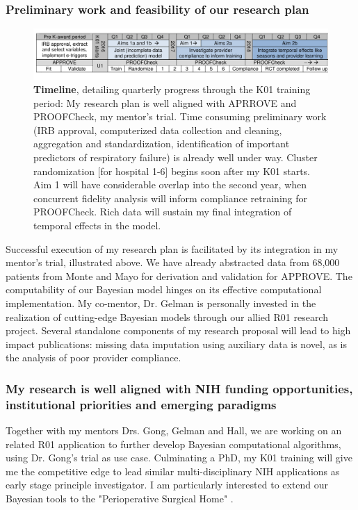 \documentclass[11pt,notitlepage]{article}
\begin{document}
\subsubsection*{Preliminary work and feasibility of our research plan }

\begin{figure}[h]
 \vspace{-20pt}
 \centering
   \includegraphics[scale=1]{Figures/Timeline.pdf}  
 \vspace{-30pt}
 \caption*{\footnotesize \textbf{Timeline}, detailing quarterly progress through the K01 training period: My research plan is well aligned with APRROVE and PROOFCheck, my mentor's trial. Time consuming preliminary work (IRB approval, computerized data collection and cleaning, aggregation and standardization, identification of important predictors of respiratory failure) is already well under way. Cluster randomization [for hospital 1-6] begins soon after my K01 starts. Aim 1 will have considerable overlap into the second year, when concurrent fidelity analysis will inform compliance retraining for PROOFCheck. Rich data will sustain my final integration of temporal effects in the model.}
  \vspace{-10pt}
  \label{fig:Timeline}
 \end{figure}
 
Successful execution of my research plan is facilitated by its integration in my mentor's trial, illustrated above. We have already abstracted data from 68,000 patients from Monte and Mayo for derivation and validation for APPROVE. The computability of our Bayesian model hinges on its effective computational implementation. My co-mentor, Dr. Gelman is personally invested in the realization of cutting-edge Bayesian models through our allied R01 research project. Several standalone components of my research proposal will lead to high impact publications: missing data imputation using auxiliary data is novel, as is the analysis of poor provider compliance. 

\subsubsection*{My research is well aligned with NIH funding opportunities, institutional priorities and emerging paradigms}
Together with my mentors Drs. Gong, Gelman and Hall, we are working on an related R01 application to further develop Bayesian computational algorithms, using Dr. Gong's trial as use case. Culminating a PhD, my K01 training will give me the competitive edge to lead similar multi-disciplinary NIH applications as early stage principle investigator. I am particularly interested to extend our Bayesian tools to the "Perioperative Surgical Home" \cite{Vetter_24781579}.
\end{document}
